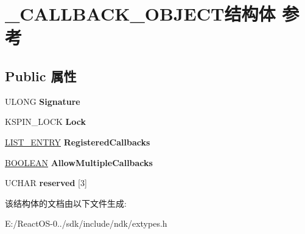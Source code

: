 \hypertarget{struct___c_a_l_l_b_a_c_k___o_b_j_e_c_t}{}\section{\+\_\+\+C\+A\+L\+L\+B\+A\+C\+K\+\_\+\+O\+B\+J\+E\+C\+T结构体 参考}
\label{struct___c_a_l_l_b_a_c_k___o_b_j_e_c_t}
\subsection*{Public 属性}
\begin{DoxyCompactItemize}
\item 
\mbox{\label{struct___c_a_l_l_b_a_c_k___o_b_j_e_c_t_ac6047ecbd5ca37c682d6d740deffeb56}} 
U\+L\+O\+NG {\bfseries Signature}
\item 
\mbox{\label{struct___c_a_l_l_b_a_c_k___o_b_j_e_c_t_a5939daebf19376d8ae602ddd71b9002f}} 
K\+S\+P\+I\+N\+\_\+\+L\+O\+CK {\bfseries Lock}
\item 
\mbox{\label{struct___c_a_l_l_b_a_c_k___o_b_j_e_c_t_a042f8773be94719e2f386d3a56cf33d6}} 
\hyperlink{struct___l_i_s_t___e_n_t_r_y}{L\+I\+S\+T\+\_\+\+E\+N\+T\+RY} {\bfseries Registered\+Callbacks}
\item 
\mbox{\label{struct___c_a_l_l_b_a_c_k___o_b_j_e_c_t_a16926fdce9d7acf5cda832bd70e6221a}} 
\hyperlink{_processor_bind_8h_a112e3146cb38b6ee95e64d85842e380a}{B\+O\+O\+L\+E\+AN} {\bfseries Allow\+Multiple\+Callbacks}
\item 
\mbox{\label{struct___c_a_l_l_b_a_c_k___o_b_j_e_c_t_ae52fd0338e1cddce8f48e7e6b03a68a4}} 
U\+C\+H\+AR {\bfseries reserved} \mbox{[}3\mbox{]}
\end{DoxyCompactItemize}


该结构体的文档由以下文件生成\+:\begin{DoxyCompactItemize}
\item 
E\+:/\+React\+O\+S-\/0../sdk/include/ndk/extypes.\+h\end{DoxyCompactItemize}
